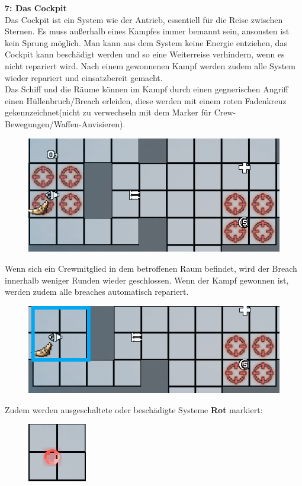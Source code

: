 \documentclass[fontsize=12pt,paper=a4,twoside]{scrartcl}
\begin{document}
\textbf{7: Das Cockpit}
\\
Das Cockpit ist ein System wie der Antrieb, essentiell für die Reise zwischen Sternen. Es muss außerhalb eines Kampfes immer bemannt sein, ansonsten ist kein Sprung möglich. Man kann aus dem System keine Energie entziehen, das Cockpit kann beschädigt werden und so eine Weiterreise verhindern, wenn es nicht repariert wird. Nach einem gewonnenen Kampf werden zudem alle System wieder repariert und einsatzbereit gemacht.
\\
Das Schiff und die Räume können im Kampf durch einen gegnerischen Angriff einen Hüllenbruch/Breach erleiden, diese werden mit einem roten Fadenkreuz gekennzeichnet(nicht zu verwechseln mit dem Marker für Crew-Bewegungen/Waffen-Anvisieren).

\begin{figure}[H]
\centering
\includegraphics[width=0.7\linewidth]{DasSpiel/Ui/breach.png}
\end{figure}

Wenn sich ein Crewmitglied in dem betroffenen Raum befindet, wird der Breach innerhalb weniger Runden wieder geschlossen. Wenn der Kampf gewonnen ist, werden zudem alle breaches automatisch repariert.

\begin{figure}[H]
\centering
\includegraphics[width=0.7\linewidth]{DasSpiel/Ui/breach2.png}
\end{figure}

Zudem werden ausgeschaltete oder beschädigte Systeme \textbf{Rot} markiert:

\begin{figure}[H]
\centering
\includegraphics[width=0.2\linewidth]{DasSpiel/Ui/system_off.png}
\end{figure}
\end{document}
